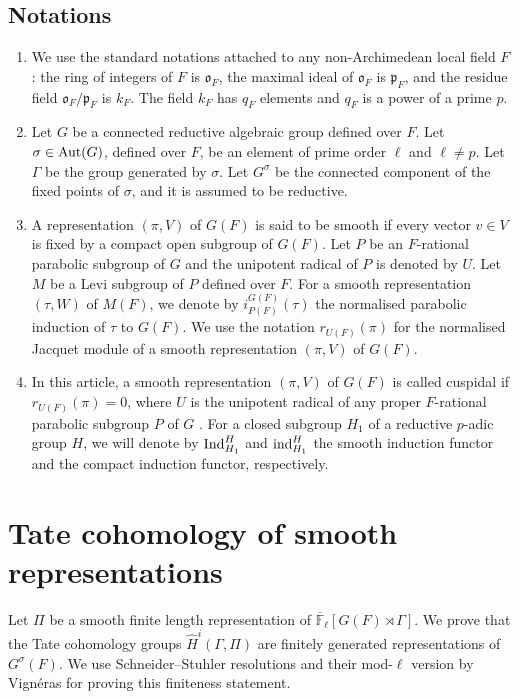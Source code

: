 \documentclass[10pt, reqno]{amsart}
\theoremstyle{plain}
\numberwithin{equation}{section} \newcommand{\di}{\operatorname{dim}}
\begin{document}
\subsection*{{\bf Notations}}
\begin{enumerate}
    \item We use the standard notations attached to
any non-Archimedean local field $F$: the ring of integers of  $F$ is
$\mathfrak{o}_F$, the maximal ideal of $\mathfrak{o}_F$ is
$\mathfrak{p}_F$, and the residue field
$\mathfrak{o}_F/\mathfrak{p}_F$ is $k_F$. The field $k_F$ has $q_F$
elements and $q_F$ is a power of a prime $p$. 
\item Let $G$ be a connected
reductive algebraic group defined over $F$.
Let
$\sigma\in {\rm Aut}(G)$, defined over $F$, be an element of prime order $\ell$ and
$\ell\neq p$.  Let $\Gamma$ be the group generated by $\sigma$. 
Let $G^\sigma$ be the connected component of the fixed points of $\sigma$,
and it is assumed to be reductive. 
\item A
representation $(\pi, V)$ of $G(F)$ is said to be smooth if every
vector $v\in V$ is fixed by a compact open subgroup of $G(F)$. Let $P$
be an $F$-rational parabolic subgroup of $G$ and the unipotent 
radical of $P$ is denoted by $U$. Let $M$ be a Levi
subgroup of $P$ defined over $F$. For a smooth representation $(\tau, W)$ of
$M(F)$, we denote by $i_{P(F)}^{G(F)}(\tau)$ the normalised parabolic
induction of $\tau$ to $G(F)$. We use the notation
$r_{U(F)}(\pi)$ for the normalised Jacquet module of a smooth
representation $(\pi, V)$ of $G(F)$.
\item  In this article, a smooth
representation $(\pi, V)$ of $G(F)$ is called cuspidal if
$r_{U(F)}(\pi)=0$, where $U$ is the unipotent radical of any proper
$F$-rational parabolic
subgroup $P$ of $G$ . For a closed subgroup $H_1$ of a reductive
$p$-adic group $H$, we will denote by ${\rm Ind}_{H_1}^H$ and
${\rm ind}_{H_1}^H$ the smooth induction functor and the compact
induction functor, respectively.
\end{enumerate}   

\section{Tate cohomology of smooth representations}\label{finte_gen}
Let $\Pi$ be a smooth finite length representation of $\overline{\mathbb{F}}
_\ell[G(F)\rtimes \Gamma]$. We prove that the Tate
cohomology groups $\widehat{H}^i(\Gamma, \Pi)$ are finitely generated
representations of $G^\sigma(F)$. We use Schneider--Stuhler
resolutions and their mod-$\ell$ version by Vign\'eras for proving this
finiteness statement. 
\end{document}
